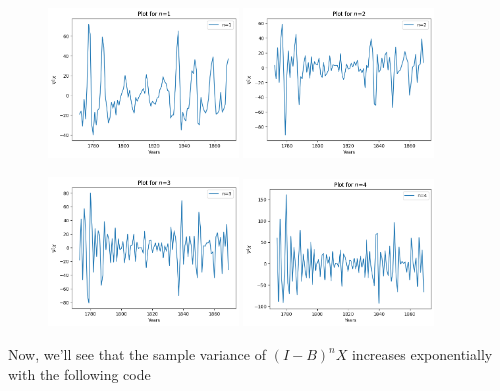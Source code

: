\begin{figure}[H]
    \centering
    \includegraphics[width=0.45\textwidth]{../pictures/image2.png}
    \hfill
    \includegraphics[width=0.45\textwidth]{../pictures/image3.png}
\end{figure}

\begin{figure}[H]
    \centering
    \includegraphics[width=0.45\textwidth]{../pictures/image4.png}
    \hfill
    \includegraphics[width=0.45\textwidth]{../pictures/image5.png}
\end{figure}

Now, we'll see that the sample variance of $(I-B)^n X$ increases exponentially with the following code

